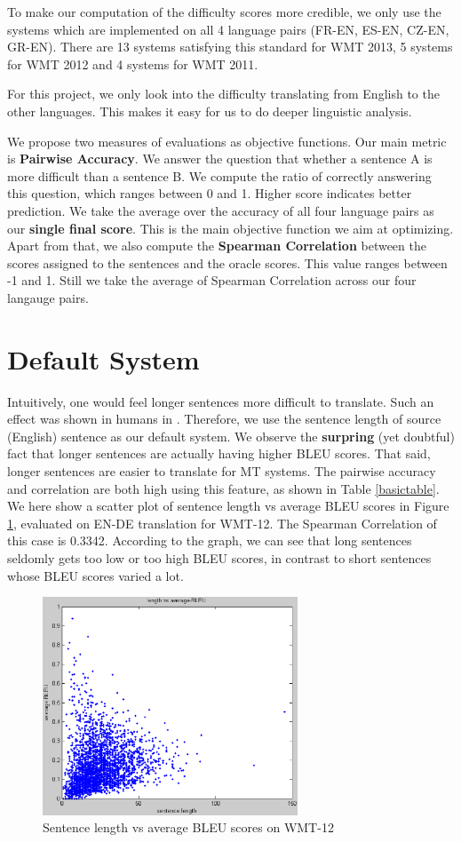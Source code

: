 \documentclass[11pt]{article}
\begin{document}
To make our computation of the difficulty scores more credible, we only use the systems which are implemented on all 4 language pairs (FR-EN, ES-EN, CZ-EN, GR-EN). 
There are 13 systems satisfying this standard for WMT 2013, 5 systems for WMT 2012 and 4 systems for WMT 2011.

For this project, we only look into the difficulty translating from English to the other languages. 
This makes it easy for us to do deeper linguistic analysis. 

We propose two measures of evaluations as objective functions. 
Our main metric is \textbf{Pairwise Accuracy}. We answer the question that whether a sentence A is more difficult than a sentence B. 
We compute the ratio of correctly answering this question, which ranges between 0 and 1. Higher score indicates better prediction.
We take the average over the accuracy of all four language pairs as our \textbf{single final score}.
This is the main objective function we aim at optimizing. 
Apart from that,  we also compute the \textbf{Spearman Correlation} between the scores assigned to the sentences and the oracle scores.
This value ranges between -1 and 1. Still we take the average of Spearman Correlation across our four langauge pairs. 

\section{Default System}
\label{ssec:default}
Intuitively, one would feel longer sentences more difficult to translate. 
Such an effect was shown in humans in .
Therefore, we use the sentence length of source (English) sentence as our default system. 
We observe the \textbf{surpring} (yet doubtful) fact that longer sentences are actually having higher BLEU scores.
That said, longer sentences are easier to translate for MT systems.
The pairwise accuracy and correlation are both high using this feature, as shown in Table \ref{basictable}.
We here show a scatter plot of sentence length vs average BLEU scores in Figure \ref{fig:aa}, evaluated on EN-DE translation for WMT-12.
The Spearman Correlation of this case is 0.3342. 
According to the graph, we can see that long sentences seldomly gets too low or too high BLEU scores, in contrast to short sentences whose BLEU scores varied a lot. 

\begin{figure}[htbp]
\small
\centering
\includegraphics[height=65mm]{length_spearman.eps}
\caption{Sentence length vs average BLEU scores on WMT-12}
\label{fig:aa}
\end{figure}
\end{document}
